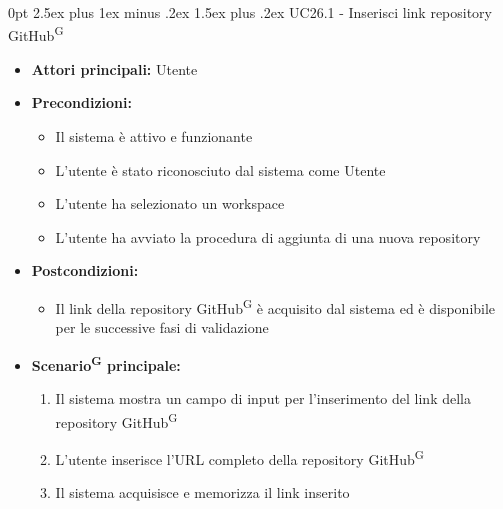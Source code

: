 \documentclass[a4paper, 11pt]{article}
\makeatletter
\renewcommand\paragraph{\@startsection{paragraph}{4}
  {0pt}
  {2.5ex plus 1ex minus .2ex}
  {1.5ex plus .2ex}
  {\normalfont\normalsize\bfseries\color{AccentDark}}}
\makeatother
\begin{document}
\paragraph{UC26.1 - Inserisci link repository GitHub\textsuperscript{G}}\label{UC26.1}
\begin{itemize}
	\item \textbf{Attori principali:} Utente
	\item \textbf{Precondizioni:}
	\begin{itemize}
		\item Il sistema è attivo e funzionante
		\item L'utente è stato riconosciuto dal sistema come Utente
		\item L'utente ha selezionato un workspace
		\item L'utente ha avviato la procedura di aggiunta di una nuova repository
	\end{itemize}
	\item \textbf{Postcondizioni:}
	\begin{itemize}
		\item Il link della repository GitHub\textsuperscript{G} è acquisito dal sistema ed è disponibile per le successive fasi di validazione
	\end{itemize}
	\item \textbf{Scenario\textsuperscript{G} principale:}
	\begin{enumerate}
		\item Il sistema mostra un campo di input per l'inserimento del link della repository GitHub\textsuperscript{G}
		\item L'utente inserisce l'URL completo della repository GitHub\textsuperscript{G}
		\item Il sistema acquisisce e memorizza il link inserito
	\end{enumerate}
\end{itemize}
\end{document}
